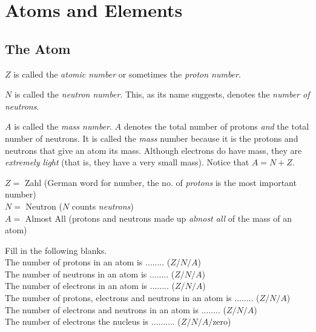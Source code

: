 
\chapter{Atoms and Elements}




\section{The Atom}




$Z$ is called the 
\textit{atomic number} or sometimes the \textit{proton number}. 


$N$ is called the \textit{neutron number}. This, as its name 
suggests, denotes the \textit{number of neutrons}.


$A$ is called the \textit{mass number}. 
$A$ denotes the total number of protons \textit{and} the total 
number of neutrons. It is called the \textit{mass} number
because it is the protons and neutrons that give an atom its mass. Although 
electrons do have mass, they are \textit{extremely light} (that is, 
they have a very small mass). 
Notice that $A = N + Z$. 

\frmrule

$Z =$ Zahl (German word for number, the no. of \textit{protons} is the most important number) \\
$N =$ Neutron ($N$ counts \textit{neutrons}) \\
$A =$ Almost All (protons and neutrons made up \textit{almost all} of the mass of an atom) \\


\frmrule

\begin{example}
Fill in the following blanks. \\
The number of protons in an atom is ........ ($Z/N/A$) \\
The number of neutrons in an atom is ........ ($Z/N/A$) \\
The number of electrons in an atom is ........ ($Z/N/A$) \\
The number of protons, electrons and neutrons in an atom is ........ ($Z/N/A$) \\
The number of electrons and neutrons in an atom is ........ ($Z/N/A$) \\
The number of electrons the nucleus is .......... ($Z/N/A/$zero)
\end{example}

